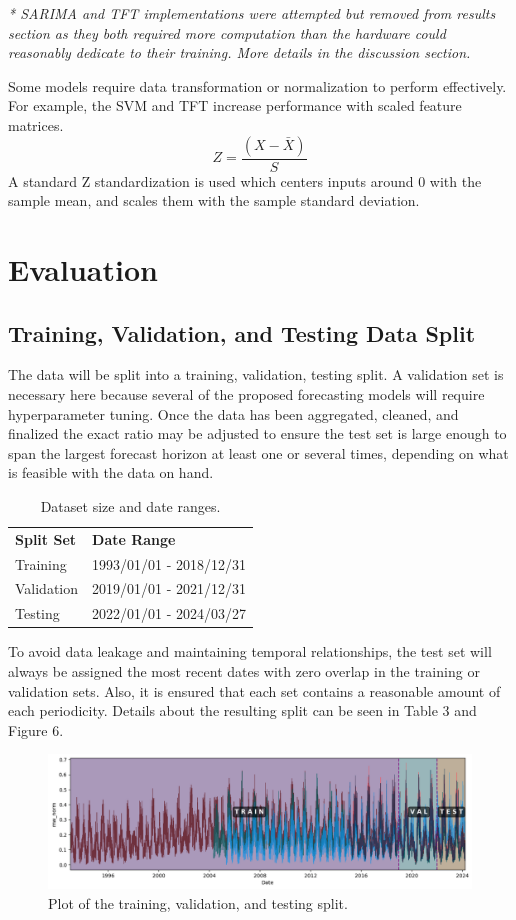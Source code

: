 \documentclass[sigconf]{acmart}
\begin{document}
\textit{* SARIMA and TFT implementations were attempted but removed from results section as they both required more computation than the hardware could reasonably dedicate to their training. More details in the discussion section.}

Some models require data transformation or normalization to perform effectively. For example, the SVM and TFT increase performance with scaled feature matrices. $$Z = \frac{(X - \bar{X})}{S}$$ 
A standard Z standardization is used which centers inputs around 0 with the sample mean, and scales them with the sample standard deviation.

\section{Evaluation}

\subsection{Training, Validation, and Testing Data Split}
The data will be split into a training, validation, testing split. A validation set is necessary here because several of the proposed forecasting models will require hyperparameter tuning. Once the data has been aggregated, cleaned, and finalized the exact ratio may be adjusted to ensure the test set is large enough to span the largest forecast horizon at least one or several times, depending on what is feasible with the data on hand.

  \begin{table}[hbt!]
\centering
\caption{Dataset size and date ranges.}
\begin{tabular}{ll}
\toprule
\textbf{Split Set} & \textbf{Date Range} \\
\cmidrule(rl){1-1}\cmidrule(rl){2-2}
  Training & 1993/01/01 - 2018/12/31 \\
  Validation & 2019/01/01 - 2021/12/31  \\   
  Testing & 2022/01/01 - 2024/03/27  \\   
  \bottomrule
\end{tabular}
\end{table}

To avoid data leakage and maintaining temporal relationships, the test set will always be assigned the most recent dates with zero overlap in the training or validation sets. Also, it is ensured that each set contains a reasonable amount of each periodicity. Details about the resulting split can be seen in Table 3 and Figure 6.
  \begin{figure}[hbt!]
    \includegraphics[width=\columnwidth]{Images/Split_Plot.png}
    \caption{Plot of the training, validation, and testing split.}
    \Description{}
    \label{fig:split}
  \end{figure}
\end{document}
